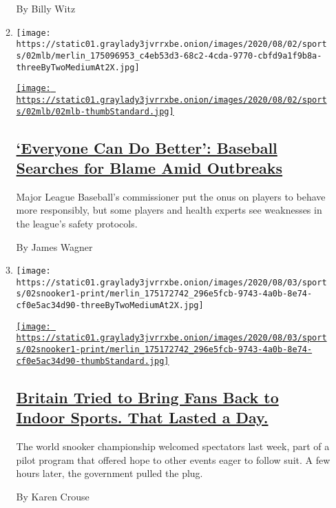 \begin{enumerate}
\begin{enumerate}
    By Billy Witz
  \item
    \texttt{[image: https://static01.graylady3jvrrxbe.onion/images/2020/08/02/sports/02mlb/merlin\_175096953\_c4eb53d3-68c2-4cda-9770-cbfd9a1f9b8a-threeByTwoMediumAt2X.jpg]}

    \href{/2020/08/02/sports/baseball/mlb-coronavirus-outbreaks.html}{\texttt{[image: https://static01.graylady3jvrrxbe.onion/images/2020/08/02/sports/02mlb/02mlb-thumbStandard.jpg]}}

    \hypertarget{everyone-can-do-better-baseball-searches-for-blame-amid-outbreaks}{%
    \subsection{\texorpdfstring{\href{/2020/08/02/sports/baseball/mlb-coronavirus-outbreaks.html}{`Everyone
    Can Do Better': Baseball Searches for Blame Amid
    Outbreaks}}{`Everyone Can Do Better': Baseball Searches for Blame Amid Outbreaks}}\label{everyone-can-do-better-baseball-searches-for-blame-amid-outbreaks}}

    Major League Baseball's commissioner put the onus on players to
    behave more responsibly, but some players and health experts see
    weaknesses in the league's safety protocols.

    By James Wagner
  \item
    \texttt{[image: https://static01.graylady3jvrrxbe.onion/images/2020/08/03/sports/02snooker1-print/merlin\_175172742\_296e5fcb-9743-4a0b-8e74-cf0e5ac34d90-threeByTwoMediumAt2X.jpg]}

    \href{/2020/08/02/sports/snooker-world-championship.html}{\texttt{[image: https://static01.graylady3jvrrxbe.onion/images/2020/08/03/sports/02snooker1-print/merlin\_175172742\_296e5fcb-9743-4a0b-8e74-cf0e5ac34d90-thumbStandard.jpg]}}

    \hypertarget{britain-tried-to-bring-fans-back-to-indoor-sports-that-lasted-a-day}{%
    \subsection{\texorpdfstring{\href{/2020/08/02/sports/snooker-world-championship.html}{Britain
    Tried to Bring Fans Back to Indoor Sports. That Lasted a
    Day.}}{Britain Tried to Bring Fans Back to Indoor Sports. That Lasted a Day.}}\label{britain-tried-to-bring-fans-back-to-indoor-sports-that-lasted-a-day}}

    The world snooker championship welcomed spectators last week, part
    of a pilot program that offered hope to other events eager to follow
    suit. A few hours later, the government pulled the plug.

    By Karen Crouse
  \end{enumerate}
\end{enumerate}


